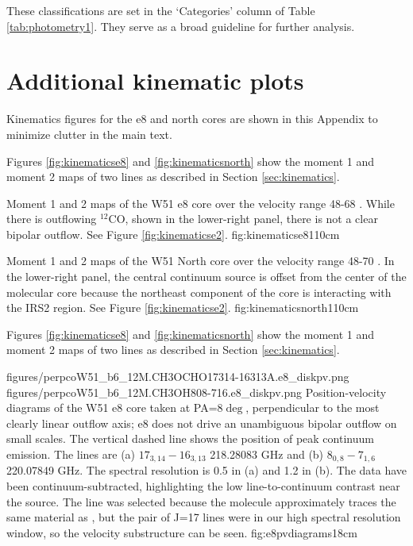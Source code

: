 \documentclass{emulateapj}
\begin{document}
These classifications are set in the `Categories' column of Table
\ref{tab:photometry1}.  They serve as a broad guideline for further
analysis.   



\section{Additional kinematic plots}
Kinematics figures for the e8 and north cores are shown in this Appendix to
minimize clutter in the main text.

Figures \ref{fig:kinematicse8} and \ref{fig:kinematicsnorth} show the moment 1
and moment 2 maps of two \methanol lines as described in Section
\ref{sec:kinematics}.

{Moment 1 and 2 maps of the W51 e8 core over the velocity
range 48-68 \kms.  While there is  outflowing $^{12}$CO, shown in the
lower-right panel, there is not a clear bipolar outflow. See Figure
\ref{fig:kinematicse2}.}
{fig:kinematicse8}{1}{10cm}

{Moment 1 and 2 maps of the W51 North core over the velocity
range 48-70 \kms.  In the lower-right panel, the central
continuum source is offset from the center of the molecular core
because the northeast component of the core is interacting
with the IRS2 \hii region. See Figure \ref{fig:kinematicse2}.}
{fig:kinematicsnorth}{1}{10cm}

Figures \ref{fig:kinematicse8} and \ref{fig:kinematicsnorth} show the moment 1
and moment 2 maps of two \methanol lines as described in Section
\ref{sec:kinematics}.

\FigureTwo
{figures/perpcoW51_b6_12M.CH3OCHO17314-16313A.e8_diskpv.png}
{figures/perpcoW51_b6_12M.CH3OH808-716.e8_diskpv.png}
{Position-velocity diagrams of the W51 e8 core taken at PA=$8\deg$,
perpendicular to the most clearly linear outflow axis; e8 does not drive an
unambiguous bipolar outflow on small scales.  The vertical dashed line shows the
position of peak continuum emission. The lines are (a) \methylformate
$17_{3,14}-16_{3,13}$ 218.28083 GHz and (b) \methanol $8_{0,8}-7_{1,6}$
220.07849 GHz.  The spectral resolution is 0.5 \kms in (a) and 1.2 \kms in (b).
The data have been continuum-subtracted, highlighting the low line-to-continuum
contrast near the source.  The \methylformate line was selected because the
molecule approximately traces the same material as \methanol, but the pair of
\methylformate J=17 lines were in our high spectral resolution window, so the
velocity substructure can be seen.
}
{fig:e8pvdiagrams}{1}{8cm}
\end{document}

